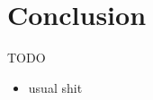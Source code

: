 
\section{Conclusion}


\begin{frame}{TODO}
\begin{itemize}
\item usual shit
\end{itemize}
\end{frame}

